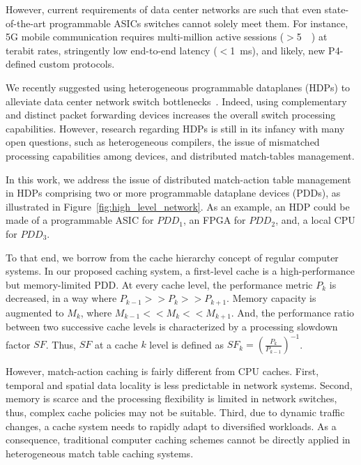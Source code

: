 However, current requirements of data center networks are such that even state-of-the-art programmable ASICs switches cannot solely meet them.
For instance, 5G mobile communication requires multi-million active sessions ($>$\SI{5}{\mega\nothing}) at terabit rates, stringently low end-to-end latency ($<$\SI{1}{\milli\second}), and likely, new P4-defined custom protocols.

We recently suggested using heterogeneous programmable dataplanes (HDPs) to alleviate data center network switch bottlenecks~\cite{p4eu:18}.
Indeed, using complementary and distinct packet forwarding devices increases the overall switch processing capabilities.
However, research regarding HDPs is still in its infancy with many open questions, such as heterogeneous compilers, the issue of mismatched processing capabilities among devices, and distributed match-tables management.

In this work, we address the issue of distributed match-action table management in HDPs comprising two or more programmable dataplane devices (PDDs), as illustrated in Figure~\ref{fig:high_level_network}.
As an example, an HDP could be made of a programmable ASIC for $PDD_1$, an  FPGA for $PDD_2$, and, a local CPU for $PDD_3$.


To that end, we borrow from the cache hierarchy concept of regular computer systems.
In our proposed caching system, a first-level cache is a high-performance but memory-limited PDD. At every cache level, the performance metric $P_{k}$ is decreased, in a way where $P_{k-1} >> P_{k} >> P_{k+1}$. Memory capacity is augmented to $M_{k}$, where $M_{k-1} << M_{k} << M_{k+1}$. And, the performance ratio between two successive cache levels is characterized by a processing slowdown factor $SF$. Thus, $SF$ at a cache $k$ level is defined as $SF_{k} = \left(\frac{P_{k}}{P_{k-1}}\right)^{-1}$.


However, match-action caching is fairly different from CPU caches.
First, temporal and spatial data locality is less predictable in network systems.
Second, memory is scarce and the processing flexibility is limited in network switches, thus, complex cache policies may not be suitable.
Third, due to dynamic traffic changes, a cache system needs to rapidly adapt to diversified workloads.
As a consequence, traditional computer caching schemes cannot be directly applied in heterogeneous match table caching systems. 

